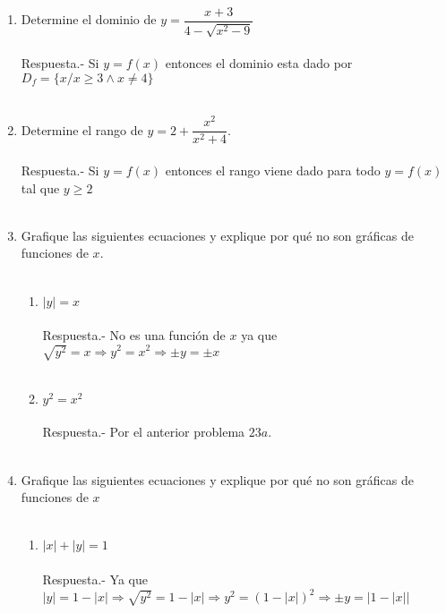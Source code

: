 \begin{enumerate}
    \item Determine el dominio de $y=\dfrac{x+3}{4-\sqrt{x^2-9}}$\\\\
	Respuesta.-\; Si $y=f(x)$ entonces el dominio esta dado por $D_f=\lbrace x / x\geq 3 \land x \neq 4 \rbrace$ \\\\

    \item Determine el rango de $y=2+\dfrac{x^2}{x^2+4}$.\\\\
	Respuesta.-\; Si $y=f(x)$ entonces el rango viene dado para todo $y=f(x)$ tal que $y\geq 2$\\\\

    \item Grafique las siguientes ecuaciones y explique por qué no son gráficas de funciones de $x$.\\\\
    
    \begin{enumerate}[\bfseries a.]
	
	\item $|y|=x$\\\\
	    Respuesta.-\; No es una función de $x$ ya que $ \sqrt{y^2}=x \Longrightarrow y^2=x^2 \Longrightarrow \pm y = \pm x$\\\\

	\item $y^2 = x^2$\\\\
	    Respuesta.-\; Por el anterior problema $23a.$\\\\
	
    \end{enumerate}

    \item Grafique las siguientes ecuaciones y explique por qué no son gráficas de funciones de $x$\\\\

    \begin{enumerate}[\bfseries a.]

	\item $|x|+|y|=1$\\\\
	    Respuesta.-\; Ya que $|y|=1 - |x| \Longrightarrow \sqrt{y^2} = 1 - |x| \Longrightarrow y^2 = (1-|x|)^2 \Longrightarrow \pm y= |1-|x||$\\\\


\end{enumerate}
\end{enumerate}
